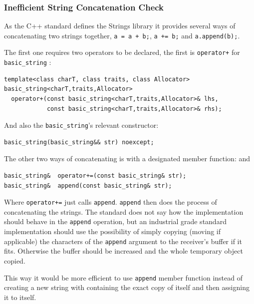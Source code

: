 \subsubsection{Inefficient String Concatenation Check}
\par As the C++ standard defines the Strings library it provides several ways of concatenating two strings together, \verb|a = a + b;|, \verb|a += b;| and \verb|a.append(b);|. \medskip
\par The first one requires two operators to be declared, the first is \verb|operator+| for \verb|basic_string| \cite[\S21.4.8.1]{cpp_standard}: 
\begin{verbatim}
template<class charT, class traits, class Allocator>
basic_string<charT,traits,Allocator>
  operator+(const basic_string<charT,traits,Allocator>& lhs,
            const basic_string<charT,traits,Allocator>& rhs);
\end{verbatim}
\par And also the \verb|basic_string|'s relevant constructor:
\begin{verbatim}
basic_string(basic_string&& str) noexcept;
\end{verbatim}
\par The other two ways of concatenating is with a designated member function: \cite[\S21.4.6.1]{cpp_standard} and \cite[\S21.4.6.2]{cpp_standard}
\begin{verbatim}
basic_string&  operator+=(const basic_string& str);
basic_string&  append(const basic_string& str);
\end{verbatim}
\par Where \verb|operator+=| just calls \verb|append|. \verb|append| then does the process of concatenating the strings. The standard does not say how the implementation should behave in the \verb|append| operation, but an industrial grade standard implementation should use the possibility of simply copying (moving if applicable) the characters of the \verb|append| argument to the receiver's buffer if it fits. Otherwise the buffer should be increased and the whole temporary object copied. \medskip
\par This way it would be more efficient to use \verb|append| member function instead of creating a new string with containing the exact copy of itself and then assigning it to itself.

